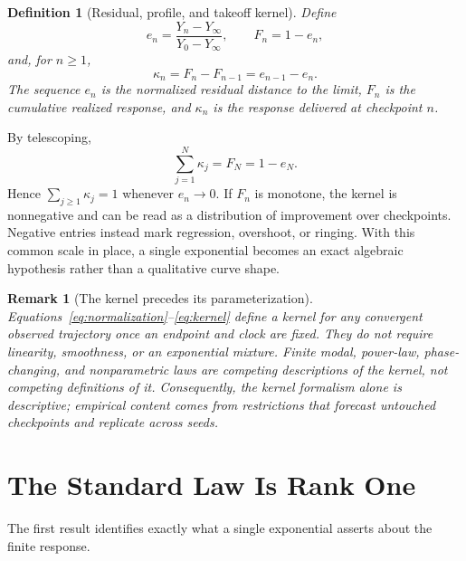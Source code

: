 \documentclass[10pt,twocolumn]{article}
\newtheorem{definition}{Definition}
\newtheorem{remark}{Remark}
\begin{document}
\begin{definition}[Residual, profile, and takeoff kernel]
Define
\begin{equation}\label{eq:normalization}
 e_n=\frac{Y_n-Y_\infty}{Y_0-Y_\infty},
 \qquad
 F_n=1-e_n,
\end{equation}
and, for $n\geq1$,
\begin{equation}\label{eq:kernel}
 \kappa_n=F_n-F_{n-1}=e_{n-1}-e_n.
\end{equation}
The sequence $e_n$ is the normalized residual distance to the limit, $F_n$ is
the cumulative realized response, and $\kappa_n$ is the response delivered at
checkpoint $n$.
\end{definition}

By telescoping,
\begin{equation}\label{eq:telescope}
 \sum_{j=1}^{N}\kappa_j=F_N=1-e_N.
\end{equation}
Hence $\sum_{j\geq1}\kappa_j=1$ whenever $e_n\to0$.  If $F_n$ is monotone,
the kernel is nonnegative and can be read as a distribution of improvement
over checkpoints.  Negative entries instead mark regression, overshoot, or
ringing.  With this common scale in place, a single exponential becomes an
exact algebraic hypothesis rather than a qualitative curve shape.

\begin{remark}[The kernel precedes its parameterization]
Equations~\eqref{eq:normalization}--\eqref{eq:kernel} define a kernel for any
convergent observed trajectory once an endpoint and clock are fixed.  They do
not require linearity, smoothness, or an exponential mixture.  Finite modal,
power-law, phase-changing, and nonparametric laws are competing descriptions
of the kernel, not competing definitions of it.  Consequently, the kernel
formalism alone is descriptive; empirical content comes from restrictions that
forecast untouched checkpoints and replicate across seeds.
\end{remark}

\section{The Standard Law Is Rank One}

The first result identifies exactly what a single exponential asserts about
the finite response.
\end{document}
